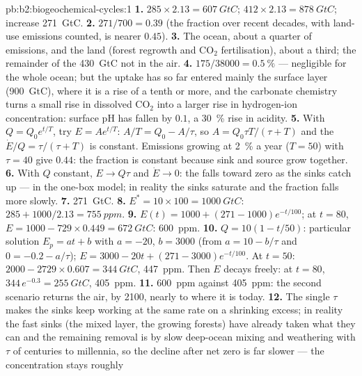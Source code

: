 \begin{solution}{pb:b2:biogeochemical-cycles:1}
\textbf{1.} $285\times 2.13 = \qty{607}{GtC}$; $412\times 2.13 =
\qty{878}{GtC}$; increase \qty{271}{GtC}.
\textbf{2.} $271/700 = 0.39$ (the fraction over recent decades,
with land-use emissions counted, is nearer $0.45$).
\textbf{3.} The ocean, about a quarter of emissions, and the land
(forest regrowth and $\mathrm{CO_2}$ fertilisation), about a third; the
remainder of the \qty{430}{GtC} not in the air.
\textbf{4.} $175/38000 = \qty{0.5}{\%}$ --- negligible for the whole
ocean; but the uptake has so far entered mainly the surface layer
(\qty{900}{GtC}), where it is a rise of a tenth or more, and the
carbonate chemistry turns a small rise in dissolved $\mathrm{CO_2}$ into a
larger rise in hydrogen-ion concentration: surface pH has fallen
by $0.1$, a \qty{30}{\%} rise in acidity.
\textbf{5.} With $Q = Q_0 e^{t/T}$, try $E = Ae^{t/T}$: $A/T = Q_0 -
A/\tau$, so $A = Q_0\tau T/(\tau + T)$ and the 
$\dot E/Q = \tau/(\tau + T)$ is constant. Emissions growing at
\qty{2}{\%} a year ($T = 50$) with $\tau = 40$ give $0.44$: the
fraction is constant because sink and source grow together.
\textbf{6.} With $Q$ constant, $E \to Q\tau$ and $\dot E \to 0$: the
 falls toward zero as the sinks catch up --- in
the one-box model; in reality the sinks saturate and the fraction
falls more slowly.
\textbf{7.} \qty{271}{GtC}.
\textbf{8.} $E^{*} = 10\times 100 = \qty{1000}{GtC}$: $285 +
1000/2.13 = \qty{755}{ppm}$.
\textbf{9.} $E(t) = 1000 + (271 - 1000)e^{-t/100}$; at $t = 80$,
$E = 1000 - 729\times 0.449 = \qty{672}{GtC}$: \qty{600}{ppm}.
\textbf{10.} $Q = 10(1 - t/50)$: particular solution $E_p = at + b$
with $a = -20$, $b = 3000$ (from $a = 10 - b/\tau$ and $0 = -0.2 -
a/\tau$); $E = 3000 - 20t + (271 - 3000)e^{-t/100}$. At $t = 50$:
$2000 - 2729\times 0.607 = \qty{344}{GtC}$, \qty{447}{ppm}. Then $E$
decays freely: at $t = 80$, $344\,e^{-0.3} = \qty{255}{GtC}$,
\qty{405}{ppm}.
\textbf{11.} \qty{600}{ppm} against \qty{405}{ppm}: the second
scenario returns the air, by 2100, nearly to where it is today.
\textbf{12.} The single $\tau$ makes the sinks keep working at the
same rate on a shrinking excess; in reality the fast sinks (the
mixed layer, the growing forests) have already taken what they can
and the remaining removal is by slow deep-ocean mixing and
weathering with $\tau$ of centuries to millennia, so the decline
after net zero is far slower --- the concentration stays roughly

\end{solution}
